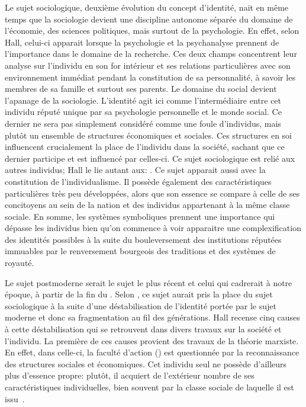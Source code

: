 Le sujet sociologique, deuxième évolution du concept d'identité, nait en même temps que la sociologie devient une discipline autonome séparée du domaine de l'économie, des sciences politiques, mais surtout de la psychologie. 
En effet, selon Hall, celui-ci apparait lorsque la psychologie et la psychanalyse prennent de l'importance dans le domaine de la recherche. 
Ces deux champs concentrent leur analyse sur l'individu en son for intérieur et ses relations particulières avec son environnement immédiat pendant la constitution de sa personnalité, à savoir les membres de sa famille et surtout ses parents. 
Le domaine du social devient l'apanage de la sociologie. 
L'identité agit ici comme l'intermédiaire entre cet individu réputé unique par sa psychologie personnelle et le monde social. 
Ce dernier ne sera pas simplement considéré comme une foule d'individus, mais plutôt un ensemble de structures économiques et sociales. 
Ces structures en soi influencent crucialement la place de l'individu dans la société, sachant que ce dernier participe et est influencé par celles-ci. 
Ce sujet sociologique est relié aux autres individus; Hall le lie autant aux: . 
Ce sujet apparait aussi avec la constitution de l'individualisme. 
Il possède également des caractéristiques particulières très peu développées, alors que son essence se compare à celle de ses concitoyens au sein de la nation et des individus appartenant à la même classe sociale. 
En somme, les systèmes symboliques prennent une importance qui dépasse les individus bien qu'on commence à voir apparaitre une complexification des identités possibles à la suite du bouleversement des institutions réputées immuables par le renversement bourgeois des traditions et des systèmes de royauté. 

Le sujet postmoderne serait le sujet le plus récent et celui qui cadrerait à notre époque, à partir de la fin du . 
Selon \citeauthor{Hall1996a}, ce sujet aurait pris la place du sujet sociologique à la suite d'une déstabilisation de l'identité portée par le sujet moderne et donc sa fragmentation au fil des générations. 
Hall recense cinq causes à cette déstabilisation qui se retrouvent dans divers travaux sur la société et l'individu. 
La première de ces causes provient des travaux de la théorie marxiste. 
En effet, dans celle-ci, la faculté d'action () est questionnée par la reconnaissance des structures sociales et économiques. 
Cet individu seul ne possède d'ailleurs plus d'essence propre: plutôt, il acquiert de l'extérieur nombre de ses caractéristiques individuelles, bien souvent par la classe sociale de laquelle il est issu~\citeyearpar[606]{Hall1996a}.

